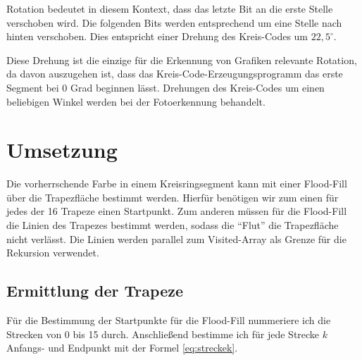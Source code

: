 Rotation bedeutet in diesem Kontext, dass das letzte Bit an die erste Stelle verschoben wird. Die folgenden Bits werden entsprechend um eine Stelle nach hinten verschoben. Dies entspricht einer Drehung des Kreis-Codes um \(22,5^{\circ}\).

Diese Drehung ist die einzige für die Erkennung von Grafiken relevante Rotation, da davon auszugehen ist, dass das Kreis-Code-Erzeugungsprogramm das erste Segment bei 0 Grad beginnen lässt. Drehungen des Kreis-Codes um einen beliebigen Winkel werden bei der Fotoerkennung behandelt.
\section{Umsetzung}
Die vorherrschende Farbe in einem Kreisringsegment kann mit einer Flood-Fill über die Trapezfläche bestimmt werden. Hierfür benötigen wir zum einen für jedes der 16 Trapeze einen Startpunkt.
Zum anderen müssen für die Flood-Fill die Linien des Trapezes bestimmt werden, sodass die "`Flut"' die Trapezfläche nicht verlässt. Die Linien werden parallel zum Visited-Array als Grenze für die Rekursion verwendet.

\subsection{Ermittlung der Trapeze}
Für die Bestimmung der Startpunkte für die Flood-Fill nummeriere ich die Strecken von 0 bis 15 durch. Anschließend bestimme ich für jede Strecke \(k\) Anfangs- und Endpunkt mit der Formel \eqref{eq:streckek}.

